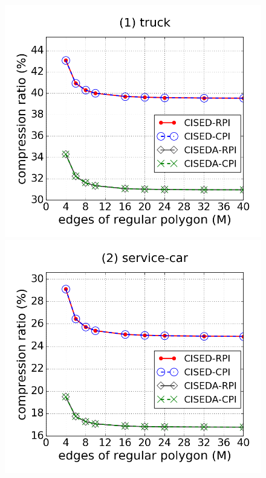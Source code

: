 \begin{figure}[tb!]
\centering
\includegraphics[scale = 0.250]{figures/Exp-M-e-20-CR-truck.png}
\includegraphics[scale = 0.250]{figures/Exp-M-e-20-CR-service.png}

\end{figure}
